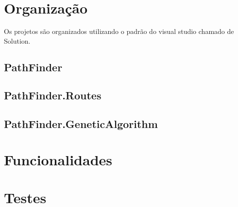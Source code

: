 \section{Organização}
Os projetos são organizados utilizando o padrão do visual studio chamado de Solution.

\subsection{PathFinder}
\subsection{PathFinder.Routes}
\subsection{PathFinder.GeneticAlgorithm}


\section{Funcionalidades}

\section{Testes}